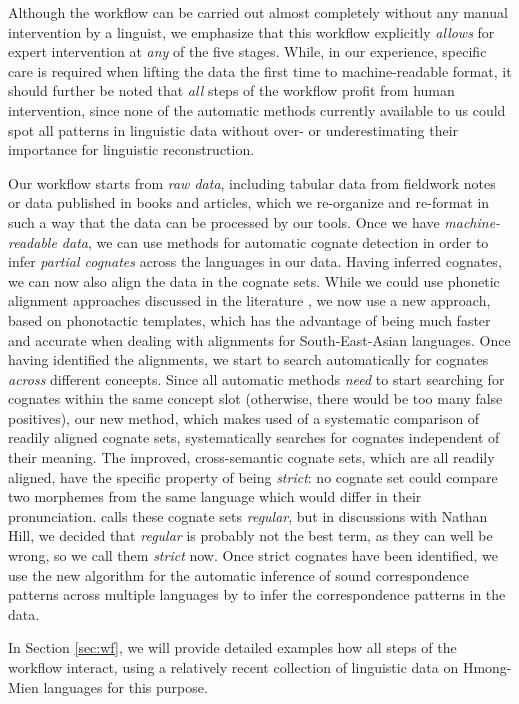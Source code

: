 \documentclass[xetex,svgnames]{scrartcl}
\begin{document}
Although the workflow can be carried out almost completely without any manual intervention by a
linguist, we emphasize that this workflow explicitly \emph{allows} for expert intervention at
\emph{any} of the five stages. While, in our experience, specific care is required when lifting the
data the first time to machine-readable format, it should further be noted that \emph{all} steps of
the workflow profit from human intervention, since none of the automatic methods currently available
to us could spot all patterns in linguistic data without over- or underestimating their importance
for linguistic reconstruction.

Our workflow starts from \emph{raw data}, including tabular data from fieldwork notes or data
published in books and articles, which we re-organize and re-format in such a way that the data can
be processed by our tools. Once we have \emph{machine-readable data}, we can use methods for
automatic cognate detection \citep{List2016g} in order to infer \emph{partial cognates} across the
languages in our data. Having inferred cognates, we can now also align the data in the cognate sets.
While we could use phonetic alignment approaches discussed in the literature \citep{List2014d}, we
now use a new approach, based on phonotactic templates, which has the advantage of being much
faster and accurate when dealing with alignments for South-East-Asian languages. Once having
identified the alignments, we start to search automatically for cognates \emph{across} different
concepts. Since all automatic methods \emph{need} to start searching for cognates within the same
concept slot (otherwise, there would be too many false positives), our new method, which makes used
of a systematic comparison of readily aligned cognate sets, systematically searches for cognates
independent of their meaning. The improved, cross-semantic cognate sets, which are all readily
aligned, have the specific property of being \emph{strict}: no cognate set could compare two
morphemes from the same language which would differ in their pronunciation. \citep{List2018PBLOG7}
calls these cognate sets \emph{regular}, but in discussions with Nathan Hill, we decided that
\emph{regular} is probably not the best term, as they can well be wrong, so we call them
\emph{strict} now. Once strict cognates have been identified, we use the new algorithm for the
automatic inference of sound correspondence patterns across multiple languages by \citet{List2019a}
to infer the correspondence patterns in the data.

In Section \ref{sec:wf}, we will provide detailed examples how all steps of the workflow interact,
using a relatively recent collection of linguistic data on Hmong-Mien languages \citep{Chen2012} for
this purpose.
\end{document}
